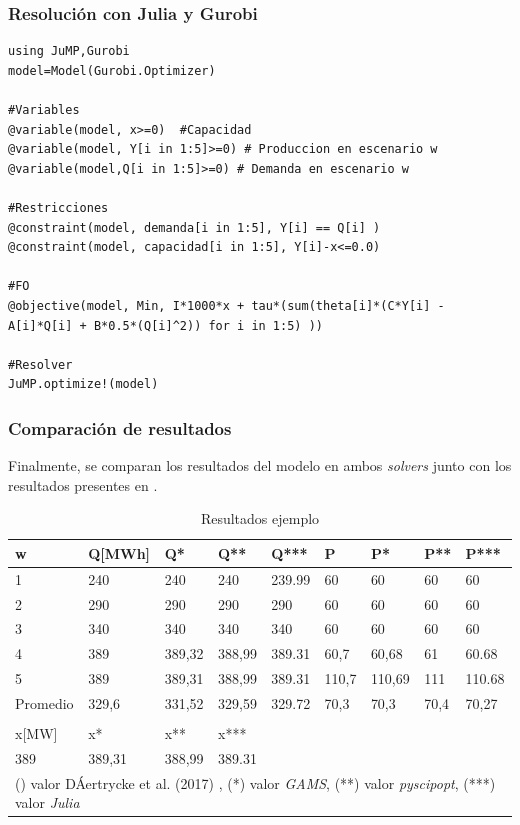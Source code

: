 \subsubsection{Resolución con Julia y Gurobi}
\begin{footnotesize}
\begin{lstlisting}
using JuMP,Gurobi
model=Model(Gurobi.Optimizer)

#Variables
@variable(model, x>=0)  #Capacidad
@variable(model, Y[i in 1:5]>=0) # Produccion en escenario w
@variable(model,Q[i in 1:5]>=0) # Demanda en escenario w

#Restricciones
@constraint(model, demanda[i in 1:5], Y[i] == Q[i] )
@constraint(model, capacidad[i in 1:5], Y[i]-x<=0.0)

#FO
@objective(model, Min, I*1000*x + tau*(sum(theta[i]*(C*Y[i] - A[i]*Q[i] + B*0.5*(Q[i]^2)) for i in 1:5) ))

#Resolver
JuMP.optimize!(model)
\end{lstlisting}
\end{footnotesize}

\subsubsection{Comparación de resultados}

Finalmente, se comparan los resultados del modelo en ambos \textit{solvers} junto con los resultados presentes en .

\begin{table}[H]
\centering
\begin{tabular}{|l|l|l|l|l|l|l|l|l|}
\hline
w & Q{[}MWh{]} & Q* & Q** & Q*** & P & P* & P** & P*** \\ \hline
1 & 240 & 240 & 240 & 239.99 & 60 & 60 & 60 & 60 \\ \hline
2 & 290 & 290 & 290 & 290 & 60 & 60 & 60 & 60 \\ \hline
3 & 340 & 340 & 340 & 340 & 60 & 60 & 60 & 60 \\ \hline
4 & 389 & 389,32 & 388,99 & 389.31 & 60,7 & 60,68 & 61 & 60.68 \\ \hline
5 & 389 & 389,31 & 388,99 & 389.31 & 110,7 & 110,69 & 111 & 110.68 \\ \hline
Promedio & 329,6 & 331,52 & 329,59 & 329.72 & 70,3 & 70,3 & 70,4 & 70,27 \\ \hline
 &  &  &  &  &  &  &  &  \\ \hline
x{[}MW{]} & x* & x** & x*** &  &  &  &  &  \\ \hline
389 & 389,31 & 388,99 & 389.31 &  &  &  &  &  \\ \hline
\multicolumn{9}{l}{\footnotesize 
() valor  DÁertrycke et al. (2017) , (*) valor \textit{GAMS}, (**) valor \textit{pyscipopt}, (***) valor \textit{Julia}}

\end{tabular}
\caption{Resultados ejemplo}
\label{tabla:ejemplos}
\end{table}

